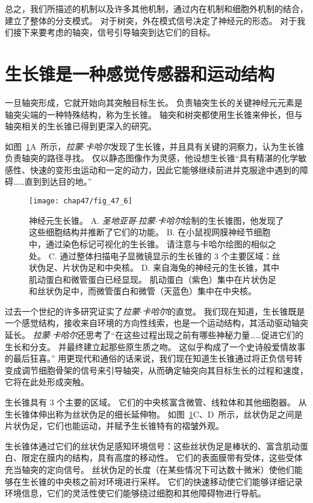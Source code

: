 总之，我们所描述的机制以及许多其他机制，通过内在机制和细胞外机制的结合，建立了整体的分支模式。
对于树突，外在模式信号决定了神经元的形态。
对于我们接下来要考虑的轴突，信号引导轴突到达它们的目标。



\section{生长锥是一种感觉传感器和运动结构}

一旦轴突形成，它就开始向其突触目标生长。
负责轴突生长的关键神经元元素是轴突尖端的一种特殊结构，称为生长锥。
轴突和树突都使用生长锥来伸长，但与轴突相关的生长锥已得到更深入的研究。


如图~\ref{fig:47_6}A~所示，\textit{拉蒙$\cdot$卡哈尔}发现了生长锥，并且具有关键的洞察力，认为生长锥负责轴突的路径寻找。
仅以静态图像作为灵感，他设想生长锥“具有精湛的化学敏感性、快速的变形虫运动和一定的动力，因此它能够继续前进并克服途中遇到的障碍……直到到达目的地。”


\begin{figure}[htbp]
	\centering
	\texttt{[image: chap47/fig\_47\_6]}
	\caption{神经元生长锥。
		A. \textit{圣地亚哥$\cdot$拉蒙$\cdot$卡哈尔}绘制的生长锥图，他发现了这些细胞结构并推断了它们的功能。
		B. 在小鼠视网膜神经节细胞中，通过染色标记可视化的生长锥。
		请注意与卡哈尔绘图的相似之处。
		C. 通过整体扫描电子显微镜显示的生长锥的 3 个主要区域：丝状伪足、片状伪足和中央核。
		D. 来自海兔的神经元的生长锥，其中肌动蛋白和微管蛋白已经显现。
		肌动蛋白（紫色）集中在片状伪足和丝状伪足中，而微管蛋白和微管（天蓝色）集中在中央核。}
	\label{fig:47_6}
\end{figure}


过去一个世纪的许多研究证实了\textit{拉蒙$\cdot$卡哈尔}的直觉。
我们现在知道，生长锥既是一个感觉结构，接收来自环境的方向性线索，也是一个运动结构，其活动驱动轴突延长。
\textit{拉蒙$\cdot$卡哈尔}还思考了“在这些过程出现之前有哪些神秘力量……促进它们的生长和分支。
并最终建立起那些原生质之吻。
这似乎构成了一个史诗般爱情故事的最后狂喜。” 
用更现代和通俗的话来说，我们现在知道生长锥通过将正负信号转变成调节细胞骨架的信号来引导轴突，从而确定轴突向其目标生长的过程和速度，它将在此处形成突触。


生长锥具有 3 个主要的区域。
它们的中央核富含微管、线粒体和其他细胞器。
从生长锥体伸出称为丝状伪足的细长延伸物。
如图~\ref{fig:47_6}C、D~所示，丝状伪足之间是片状伪足，它们也能运动，并赋予生长锥特有的褶皱外观。


生长锥体通过它们的丝状伪足感知环境信号：这些丝状伪足是棒状的、富含肌动蛋白、限定在膜内的结构，具有高度的移动性。
它们的表面膜带有受体，这些受体充当轴突的定向信号。
丝状伪足的长度（在某些情况下可达数十微米）使他们能够在生长锥的中央核之前对环境进行采样。
它们的快速移动使它们能够详细记录环境信息，它们的灵活性使它们能够绕过细胞和其他障碍物进行导航。


